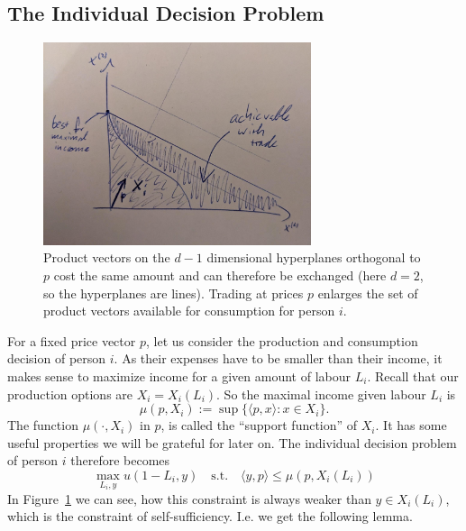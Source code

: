 \subsection{The Individual Decision Problem}

\begin{figure}
	\centering
	\includegraphics[width=0.7\textwidth]{images/consumption_increase_by_trade.jpeg}
	\caption{
		Product vectors on the \(d-1\) dimensional hyperplanes orthogonal to \(p\)
		cost the same amount and can therefore be exchanged (here \(d=2\), so the
		hyperplanes are lines). Trading at prices \(p\) enlarges the set of
		product vectors available for consumption for person \(i\).
	}
	\label{fig: consumption increase by trade}
\end{figure}
For a fixed price vector \(p\), let us consider the production and consumption
decision of person \(i\). As their expenses have to be smaller than their
income, it makes sense to maximize income for a given amount of labour \(L_i\).
Recall that our production options are \(X_i=X_i(L_i)\). So the maximal income
given labour \(L_i\) is
\[
	\tag{income}\label{eq: income}
	\mu(p, X_i) := \sup\{\langle p, x\rangle : x\in X_i\}.
\]
The function \(\mu(\cdot, X_i)\) in \(p\), is called the ``support function'' of
\(X_i\). It has some useful properties we will be grateful for later on. The
individual decision problem of person \(i\) therefore becomes
\begin{equation}
	\tag{IDP}
	\label{eq: individual decision problem}
	\max_{L_i, y} u(1-L_i, y) \quad\text{s.t.}\quad
	\langle y, p\rangle \le \mu(p, X_i(L_i))
\end{equation}
In Figure~\ref{fig: consumption increase by trade} we can see, how this
constraint is always weaker than \(y\in X_i(L_i)\), which is the constraint of
self-sufficiency. I.e. we get the following lemma.

